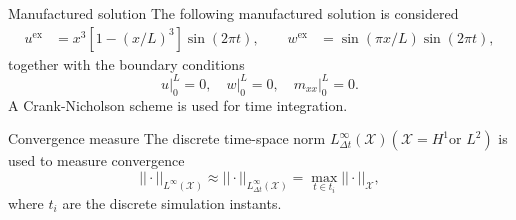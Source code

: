 \documentclass[serif]{beamer} %
\begin{document}
\begin{frame}{Manufactured solution}
	The following manufactured solution is considered
	\begin{equation*}
		\begin{aligned}
			u^{\text{ex}} &= x^3[1-(x/L)^3] \sin(2 \pi t), \qquad
			w^{\text{ex}} &= \sin(\pi x/L)\sin(2 \pi t), 
		\end{aligned}
	\end{equation*}
	together with the boundary conditions
	\begin{equation*}
		u\vert_0^L = 0, \quad w\vert_0^L =0, \quad m_{xx}\vert_{0}^L=0.
	\end{equation*}
A Crank-Nicholson scheme is used for time integration.
\begin{block}{Convergence measure}
	The discrete time-space norm $L^\infty_{\Delta t} (\mathcal{X}) (\mathcal{X} = H^1 \text{or } L^2)$ is used to measure convergence
	\[
	||\cdot ||_{L^\infty (\mathcal{X})} \approx || \cdot ||_{L^\infty_{\Delta t} (\mathcal{X})} = \max_{t \in t_i} ||\cdot||_{\mathcal{X}},
	\]
	where $t_i$ are the discrete simulation instants.
\end{block}

\end{frame}
\end{document}
